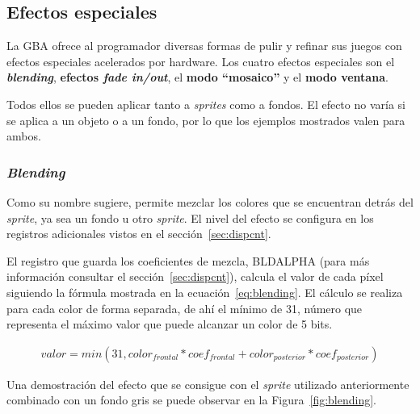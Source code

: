 \subsection{Efectos especiales}\label{sec:efectos}
La GBA ofrece al programador diversas formas de pulir y refinar sus juegos con efectos especiales acelerados por hardware. Los cuatro efectos especiales son el \textbf{\textit{blending}}, \textbf{efectos \textit{fade in/out}}, el \textbf{modo ``mosaico''} y el \textbf{modo ventana}.

Todos ellos se pueden aplicar tanto a \textit{sprites} como a fondos. El efecto no varía si se aplica a un objeto o a un fondo, por lo que los ejemplos mostrados valen para ambos.

\subsubsection{\textit{Blending}}\label{sec:efectos_blending}
Como su nombre sugiere, permite mezclar los colores que se encuentran detrás del \textit{sprite}, ya sea un fondo u otro \textit{sprite}. El nivel del efecto se configura en los registros adicionales vistos en el sección~\ref{sec:dispcnt}.

El registro que guarda los coeficientes de mezcla, BLDALPHA (para más información consultar el sección~\ref{sec:dispcnt}), calcula el valor de cada píxel siguiendo la fórmula mostrada en la ecuación~\eqref{eq:blending}. El cálculo se realiza para cada color de forma separada, de ahí el mínimo de 31, número que representa el máximo valor que puede alcanzar un color de 5 bits.

\begin{align}
	valor
	=
	min(31, color_{frontal} * coef_{frontal} + color_{posterior} * coef_{posterior})	
	\label{eq:blending}
\end{align}

Una demostración del efecto que se consigue con el \textit{sprite} utilizado anteriormente combinado con un fondo gris se puede observar en la Figura~\ref{fig:blending}.

